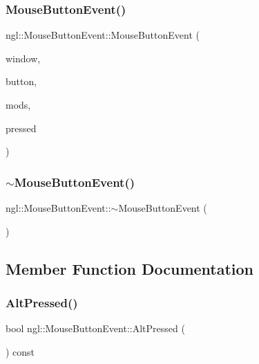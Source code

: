 \subsubsection{\texorpdfstring{Mouse\+Button\+Event()}{MouseButtonEvent()}}
{\footnotesize\ttfamily ngl\+::\+Mouse\+Button\+Event\+::\+Mouse\+Button\+Event (\begin{DoxyParamCaption}\item[{G\+L\+F\+Wwindow $\ast$}]{window,  }\item[{const int}]{button,  }\item[{const int}]{mods,  }\item[{const bool}]{pressed }\end{DoxyParamCaption})}

\mbox{\label{structngl_1_1_mouse_button_event_a5ecd52a5d43eb5c1c180760d4dd3fd94}} 
\subsubsection{\texorpdfstring{$\sim$\+Mouse\+Button\+Event()}{~MouseButtonEvent()}}
{\footnotesize\ttfamily ngl\+::\+Mouse\+Button\+Event\+::$\sim$\+Mouse\+Button\+Event (\begin{DoxyParamCaption}{ }\end{DoxyParamCaption})}



\subsection{Member Function Documentation}
\mbox{\label{structngl_1_1_mouse_button_event_a0c03942d98edb9f17ca4c65fd67354d1}} 
\subsubsection{\texorpdfstring{Alt\+Pressed()}{AltPressed()}}
{\footnotesize\ttfamily bool ngl\+::\+Mouse\+Button\+Event\+::\+Alt\+Pressed (\begin{DoxyParamCaption}{ }\end{DoxyParamCaption}) const}


